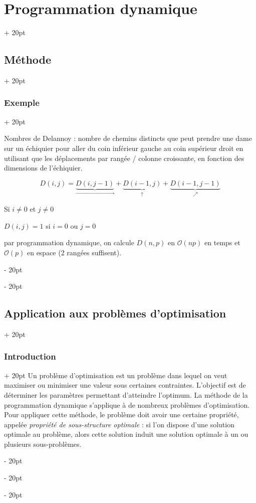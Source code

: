 \documentclass[a4paper, 12pt, twoside]{article}
\newcommand{\ind}[1][20pt]{\advance\leftskip + #1}
\newcommand{\deind}[1][20pt]{\advance\leftskip - #1}
\newenvironment{indt}[2][20pt]{#2 \par \ind[#1]}{\par \deind} %
\begin{document}
\begin{indt}{\section{Programmation dynamique}}
\begin{indt}{\subsection{Méthode}}
            \begin{indt}{\subsubsection{Exemple}}
                \label{3.1.4}
                
                Nombres de Delannoy : nombre de chemins distincts que peut prendre une dame sur un échiquier pour aller du coin inférieur gauche au coin supérieur droit en utilisant que les déplacements par rangée / colonne croissante, en fonction des dimensions de l'échiquier.
                
                \begin{center}
                \end{center}
                
                \[ D(i, j) = \underbrace{D(i, j - 1)}_{\rightarrow} + \underbrace{D(i - 1, j)}_{\uparrow} + \underbrace{D(i - 1, j - 1)}_{\nearrow} \]
                
                Si $i \neq 0$ et $j \neq 0$
                
                $D(i, j) = 1$ si $i = 0$ ou $j = 0$
                
                par programmation dynamique, on calcule $D(n, p)$ en $\mathcal O(np)$ en temps et $\mathcal O(p)$ en espace (2 rangées suffisent).
            \end{indt}
        \end{indt}
        
        \vspace{12pt}
        
        \begin{indt}{\subsection{Application aux problèmes d'optimisation}}
            \begin{indt}{\subsubsection{Introduction}}
                Un problème d'optimisation est un problème dans lequel on veut maximiser ou minimiser une valeur sous certaines contraintes.
                L'objectif est de déterminer les paramètres permettant d'atteindre l'optimum. La méthode de la programmation dynamique s'applique à de nombreux problèmes d'optimisation.
                Pour appliquer cette méthode, le problème doit avoir une certaine propriété, appelée \textit{propriété de sous-structure optimale} : si l'on dispose d'une solution optimale au problème, alors cette solution induit une solution optimale à un ou plusieurs sous-problèmes.
                

\end{indt}
\end{indt}
\end{indt}
\end{document}
